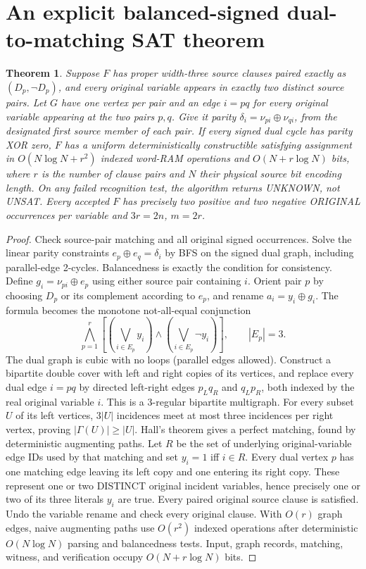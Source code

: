 \documentclass[10pt]{article}
\newtheorem{theorem}{Theorem}
\begin{document}
\section{An explicit balanced-signed dual-to-matching SAT theorem}
\begin{theorem}
Suppose $F$ has proper width-three source clauses paired exactly as $(D_p,\neg D_p)$, and every original variable appears in exactly two distinct source pairs. Let $G$ have one vertex per pair and an edge $i=pq$ for every original variable appearing at the two pairs $p,q$. Give it parity $\delta_i=\nu_{pi}\oplus\nu_{qi}$, from the designated first source member of each pair. If every signed dual cycle has parity XOR zero, $F$ has a uniform deterministically constructible satisfying assignment in $O(N\log N+r^2)$ indexed word-RAM operations and $O(N+r\log N)$ bits, where $r$ is the number of clause pairs and $N$ their physical source bit encoding length. On any failed recognition test, the algorithm returns UNKNOWN, not UNSAT. Every accepted $F$ has precisely two positive and two negative ORIGINAL occurrences per variable and $3r=2n$, $m=2r$.
\end{theorem}
\begin{proof}
Check source-pair matching and all original signed occurrences. Solve the linear parity constraints $e_p\oplus e_q=\delta_i$ by BFS on the signed dual graph, including parallel-edge 2-cycles. Balancedness is exactly the condition for consistency. Define $g_i=\nu_{pi}\oplus e_p$ using either source pair containing $i$. Orient pair $p$ by choosing $D_p$ or its complement according to $e_p$, and rename $a_i=y_i\oplus g_i$. The formula becomes the monotone not-all-equal conjunction
\[
\bigwedge_{p=1}^{r}\left[(\bigvee_{i\in E_p}y_i)
 \land(\bigvee_{i\in E_p}\neg y_i)\right],\qquad |E_p|=3.
\]
The dual graph is cubic with no loops (parallel edges allowed). Construct a bipartite double cover with left and right copies of its vertices, and replace every dual edge $i=pq$ by directed left-right edges $p_Lq_R$ and $q_Lp_R$, both indexed by the real original variable $i$. This is a 3-regular bipartite multigraph. For every subset $U$ of its left vertices, $3|U|$ incidences meet at most three incidences per right vertex, proving $|\Gamma(U)|\ge|U|$. Hall's theorem gives a perfect matching, found by deterministic augmenting paths. Let $R$ be the set of underlying original-variable edge IDs used by that matching and set $y_i=1$ iff $i\in R$. Every dual vertex $p$ has one matching edge leaving its left copy and one entering its right copy. These represent one or two DISTINCT original incident variables, hence precisely one or two of its three literals $y_i$ are true. Every paired original source clause is satisfied. Undo the variable rename and check every original clause. With $O(r)$ graph edges, naive augmenting paths use $O(r^2)$ indexed operations after deterministic $O(N\log N)$ parsing and balancedness tests. Input, graph records, matching, witness, and verification occupy $O(N+r\log N)$ bits.
\end{proof}
\end{document}
